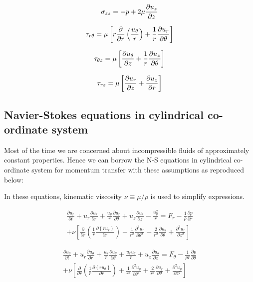 \begin{equation}
\sigma_{zz} = -p + 2 \mu {\partial u_z \over \partial z}
\end{equation}

\begin{equation}
\tau_{r\theta} = \mu \left[ r {\partial \over \partial r} \left( {u_\theta \over r} \right) + {1 \over r} {\partial u_r \over \partial \theta} \right]
\end{equation}

\begin{equation}
\tau_{\theta z} = \mu \left[ {\partial u_\theta \over \partial z} + {1 \over r} {\partial u_z \over \partial \theta} \right]
\end{equation}

\begin{equation}
\tau_{rz} = \mu \left[ {\partial u_r \over \partial z} + {\partial u_z \over \partial r} \right]
\end{equation}


\subsection{Navier-Stokes equations in cylindrical co-ordinate system}

Most of the time we are concerned about incompressible fluids of approximately constant properties. Hence we can borrow the N-S equations in cylindrical co-ordinate system for momentum transfer with these assumptions as reproduced below:

In these equations, kinematic viscosity $\nu \equiv { \mu / \rho}$ is used to simplify expressions.

\begin{align}
\frac{\partial u_r}{\partial t} + u_r \frac{\partial u_r}{\partial r} + \frac{u_\theta}{r} \frac{\partial u_r}{\partial \theta} + u_z \frac{\partial u_r}{\partial z} - \frac{u_\theta^2}{r} = F_r -\frac{1}{\rho}\frac{\partial p}{\partial r} \nonumber \\
+ \nu \left[ \frac{\partial}{\partial r}\left(\frac{1}{r} \frac{\partial \left\{r u_r\right\}}{\partial r} \right) + \frac{1}{r^2}\frac{\partial^2 u_r}{\partial \theta^2} - \frac{2}{r^2}\frac{\partial u_\theta}{\partial \theta} + \frac{\partial^2 u_r}{\partial z^2} \right] 
\end{align}

\begin{align}
\frac{\partial u_\theta}{\partial t} + u_r \frac{\partial u_\theta}{\partial r} + \frac{u_\theta}{r} \frac{\partial u_\theta}{\partial \theta} + \frac{u_r u_\theta}{r} + u_z \frac{\partial u_\theta}{\partial z} = F_\theta -\frac{1}{\rho r}\frac{\partial p}{\partial \theta} \nonumber \\
+ \nu \left[ \frac{\partial}{\partial r}\left(\frac{1}{r} \frac{\partial \left\{r u_\theta\right\}}{\partial r} \right) + \frac{1}{r^2}\frac{\partial^2 u_\theta}{\partial \theta^2} + \frac{2}{r^2}\frac{\partial u_r}{\partial \theta} + \frac{\partial^2 u_\theta}{\partial z^2} \right] 
\end{align}

